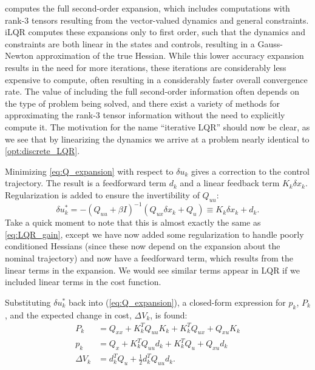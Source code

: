\documentclass[../root.tex]{subfiles}
\begin{document}
    computes the full second-order expansion, which includes computations
    with rank-3 tensors resulting from the vector-valued dynamics and general
    constraints. iLQR computes these expansions only to first order, such
    that the dynamics and constraints are both linear in the states and
    controls, resulting in a Gauss-Newton approximation of the true Hessian.
    While this lower accuracy expansion results in the need for more
    iterations, these iterations are considerably less expensive to compute,
    often resulting in a considerably faster overall convergence rate. The
    value of including the full second-order information often depends on the
    type of problem being solved, and there exist a variety of methods for
    approximating the rank-3 tensor information without the need to
    explicitly compute it. The motivation for the name ``iterative LQR''
    should now be clear, as we see that by linearizing the dynamics we arrive
    at a problem nearly identical to \eqref{opt:discrete_LQR}.

    Minimizing \eqref{eq:Q_expansion} with respect to $\delta u_k$ gives a
    correction to the control trajectory. The result is a feedforward term
    $d_k$ and a linear feedback term $K_k \delta x_k$. Regularization is
    added to ensure the invertibility of $Q_{uu}$:
    \begin{equation} \label{eq:gains}
        \delta u_k^* = -(Q_{uu} + \beta I)^{-1}(Q_{ux} \delta x_k + Q_u) \equiv K_k \delta x_k + d_k.
    \end{equation}
    Take a quick moment to note that this is almost exactly the same as
    \eqref{eq:LQR_gain}, except we have now added some regularization to
    handle poorly conditioned Hessians (since these now depend on the
    expansion about the nominal trajectory) and now have a feedforward term,
    which results from the linear terms in the expansion. We would see
    similar terms appear in LQR if we included linear terms in the cost
    function.

    Substituting $\delta u_k^*$ back into (\ref{eq:Q_expansion}), a closed-form
    expression for $p_k$, $P_k$, and the expected change in cost, $\Delta
    V_k$, is found:
    \begin{subequations} \label{eq:ctg_update}
    \begin{align}
    P_k &= Q_{xx} + K_k^T Q_{uu} K_k + K_k^T Q_{ux} + Q_{xu} K_k \label{eq:ctg_hess_gen}\\
    p_k &= Q_x + K_k^T Q_{uu} d_k  + K_k^T Q_u + Q_{xu}d_k \label{eq:ctg_grad_gen}\\
    \Delta V_k &= d_k^T Q_u + \frac{1}{2}d_k^T Q_{uu} d_k \label{eq:dV}.
    \end{align}
    \end{subequations}
        
\end{document}
